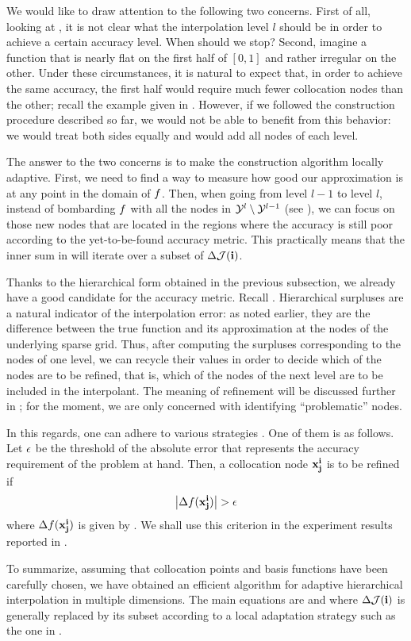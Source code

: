 We would like to draw attention to the following two concerns. First of all,
looking at , it is not clear what the interpolation
level $l$ should be in order to achieve a certain accuracy level. When should we
stop? Second, imagine a function that is nearly flat on the first half of $[0,
1]$ and rather irregular on the other. Under these circumstances, it is natural
to expect that, in order to achieve the same accuracy, the first half would
require much fewer collocation nodes than the other; recall the example given in
. However, if we followed the construction procedure described
so far, we would not be able to benefit from this behavior: we would treat both
sides equally and would add all nodes of each level.

The answer to the two concerns is to make the construction algorithm locally
adaptive. First, we need to find a way to measure how good our approximation is
at any point in the domain of $f$. Then, when going from level $l - 1$ to level
$l$, instead of bombarding $f$ with all the nodes in $\mathcal{Y}^l \setminus \mathcal{Y}^{l -
1}$ (see ), we can focus on those new nodes that
are located in the regions where the accuracy is still poor according to the
yet-to-be-found accuracy metric. This practically means that the inner sum in
 will iterate over a subset of $\Delta\mathcal{J}(\mathbf{i})$.

Thanks to the hierarchical form obtained in the previous subsection, we already
have a good candidate for the accuracy metric. Recall .
Hierarchical surpluses are a natural indicator of the interpolation error: as
noted earlier, they are the difference between the true function and its
approximation at the nodes of the underlying sparse grid. Thus, after computing
the surpluses corresponding to the nodes of one level, we can recycle their
values in order to decide which of the nodes are to be refined, that is, which
of the nodes of the next level are to be included in the interpolant. The
meaning of refinement will be discussed further in ; for
the moment, we are only concerned with identifying ``problematic'' nodes.

In this regards, one can adhere to various strategies \cite{ma2009}. One of them
is as follows. Let $\epsilon$ be the threshold of the absolute error that
represents the accuracy requirement of the problem at hand. Then, a collocation
node $\mathbf{x}^{\mathbf{i}}_{\mathbf{j}}$ is to be refined if
\begin{equation} \elab{error}
  \left| \surplus(\vx^\vi_\vj) \right| > \error
\end{equation}
where $\Delta f(\mathbf{x}^{\mathbf{i}}_{\mathbf{j}})$ is given by . We shall use this
criterion in the experiment results reported in .

To summarize, assuming that collocation points and basis functions have been
carefully chosen, we have obtained an efficient algorithm for adaptive
hierarchical interpolation in multiple dimensions. The main equations are
 and  where $\Delta\mathcal{J}(\mathbf{i})$ is
generally replaced by its subset according to a local adaptation strategy such
as the one in .
